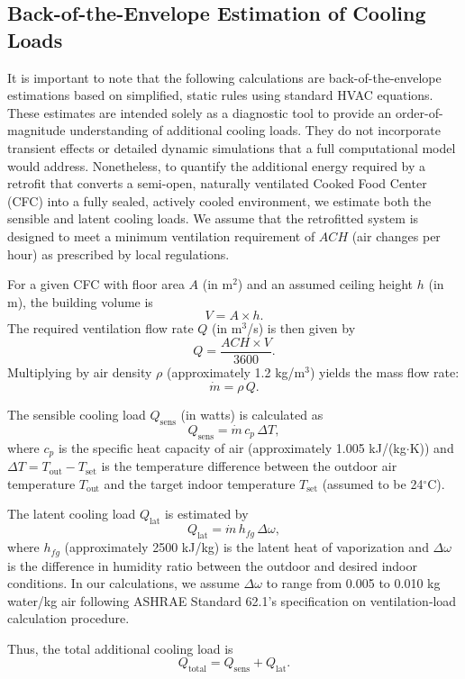 \documentclass[preprint,12pt]{elsarticle}
\begin{document}
\subsection{Back-of-the-Envelope Estimation of Cooling Loads}\label{seg:energy}

It is important to note that the following calculations are back-of-the-envelope estimations based on simplified, static rules using standard HVAC equations. These estimates are intended solely as a diagnostic tool to provide an order-of-magnitude understanding of additional cooling loads. They do not incorporate transient effects or detailed dynamic simulations that a full computational model would address. Nonetheless, to quantify the additional energy required by a retrofit that converts a semi-open, naturally ventilated Cooked Food Center (CFC) into a fully sealed, actively cooled environment, we estimate both the sensible and latent cooling loads. We assume that the retrofitted system is designed to meet a minimum ventilation requirement of $ACH$ (air changes per hour) as prescribed by local regulations.

For a given CFC with floor area $A$ (in m$^2$) and an assumed ceiling height $h$ (in m), the building volume is
\[
V = A \times h.
\]
The required ventilation flow rate $Q$ (in m$^3$/s) is then given by
\[
Q = \frac{ACH \times V}{3600}.
\]
Multiplying by air density $\rho$ (approximately 1.2 kg/m$^3$) yields the mass flow rate:
\[
\dot{m} = \rho\, Q.
\]

The sensible cooling load $Q_{\text{sens}}$ (in watts) is calculated as
\[
Q_{\text{sens}} = \dot{m}\, c_p\, \Delta T,
\]
where $c_p$ is the specific heat capacity of air (approximately 1.005 kJ/(kg$\cdot$K)) and $\Delta T = T_{\text{out}} - T_{\text{set}}$ is the temperature difference between the outdoor air temperature $T_{\text{out}}$ and the target indoor temperature $T_{\text{set}}$ (assumed to be 24$^\circ$C).

The latent cooling load $Q_{\text{lat}}$ is estimated by
\[
Q_{\text{lat}} = \dot{m}\, h_{fg}\, \Delta \omega,
\]
where $h_{fg}$ (approximately 2500 kJ/kg) is the latent heat of vaporization and $\Delta \omega$ is the difference in humidity ratio between the outdoor and desired indoor conditions. In our calculations, we assume $\Delta \omega$ to range from 0.005 to 0.010 kg water/kg air following ASHRAE Standard 62.1's specification on ventilation‑load calculation procedure\cite{ashrae2022}.

Thus, the total additional cooling load is
\[
Q_{\text{total}} = Q_{\text{sens}} + Q_{\text{lat}}.
\]
\end{document}

